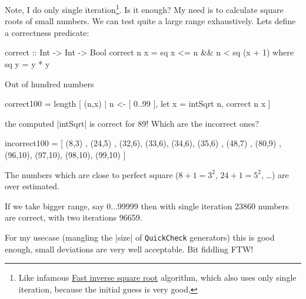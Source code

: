 Note, I do only single iteration\footnote{
  Like infamous \href{https://en.wikipedia.org/wiki/Fast_inverse_square_root}{Fast inverse square root} algorithm,
  which also uses only single iteration, because the initial guess is very good,
}. Is it enough?
My need is to calculate square roots of small numbers.
We can test quite a large range exhaustively.
Lets define a correctness predicate:

\begin{code}
correct :: Int -> Int -> Bool
correct n x = sq x <= n && n < sq (x + 1) where sq y = y * y
\end{code}

Out of hundred numbers
\begin{code}
correct100 = length
    [ (n,x) | n <- [ 0..99 ], let x = intSqrt n, correct n x ]
\end{code}
the computed |intSqrt| is correct for 89!
Which are the incorrect ones?

\begin{code}
incorrect100 =
    [ (8,3)
    , (24,5)
    , (32,6), (33,6), (34,6), (35,6)
    , (48,7)
    , (80,9)
    , (96,10), (97,10), (98,10), (99,10)
    ]
\end{code}

The numbers which are close to perfect square ($8 + 1 = 3^2$, $24 + 1 = 5^2$, \ldots)
are over estimated.

If we take bigger range, say 0...99999 then
with single iteration 23860 numbers are correct, with two iterations 96659.

For my usecase (mangling the |size| of \texttt{QuickCheck} generators) this is good enough,
small deviations are very well acceptable. Bit fiddling FTW!
